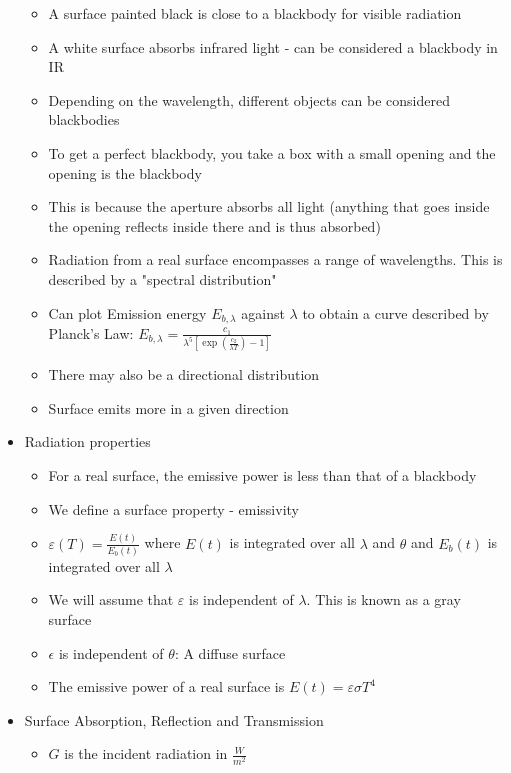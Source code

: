 \documentclass[12pt]{article}
\begin{document}
\begin{itemize}
\begin{itemize}
        \item A surface painted black is close to a blackbody for visible radiation 
        \item A white surface absorbs infrared light - can be considered a blackbody in IR 
        \item Depending on the wavelength, different objects can be considered blackbodies
        \item To get a perfect blackbody, you take a box with a small opening and the opening is the blackbody 
        \item This is because the aperture absorbs all light (anything that goes inside the opening reflects inside there and is thus absorbed)
        \item Radiation from a real surface encompasses a range of wavelengths. This is described by a "spectral distribution"
        \item Can plot Emission energy $E_{b, \lambda}$ against $\lambda$ to obtain a curve described by Planck's Law: $E_{b, \lambda}  = \frac{c_1}{\lambda^5 \left[ \exp(\frac{c_2}{\lambda T}) -1 \right]}$
        \item There may also be a directional distribution
        \item Surface emits more in a given direction
    \end{itemize}
    \item Radiation properties \begin{itemize}
        \item For a real surface, the emissive power is less than that of a blackbody 
        \item We define a surface property - emissivity
        \item $\varepsilon(T) = \frac{E(t)}{E_b(t)}$ where $E(t)$ is integrated over all $\lambda$ and $\theta$ and $E_b(t)$ is integrated over all $\lambda$
        \item We will assume that $\varepsilon$ is independent of $\lambda$. This is known as a gray surface
        \item $\epsilon$ is independent of $\theta$: A diffuse surface
        \item The emissive power of a real surface is $E(t) = \varepsilon \sigma T^4$
    \end{itemize}
    \item Surface Absorption, Reflection and Transmission  \begin{itemize}
        \item $G$ is the incident radiation in $\frac{W}{m^2}$

\end{itemize}
\end{itemize}
\end{document}
